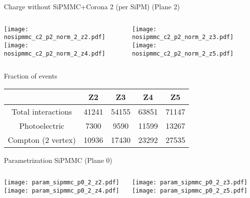\documentclass{beamer}
\begin{document}
\begin{frame}{Charge without SiPMMC+Corona 2 (per SiPM) (Plane 2)}
	\begin{columns}[onlytextwidth]
		\begin{column}{0.5\textwidth}
			\texttt{[image: nosipmmc\_c2\_p2\_norm\_2\_z2.pdf]} \\
			\texttt{[image: nosipmmc\_c2\_p2\_norm\_2\_z4.pdf]}
		 \end{column}
		 \begin{column}{0.5\textwidth}
			\texttt{[image: nosipmmc\_c2\_p2\_norm\_2\_z3.pdf]} \\
			\texttt{[image: nosipmmc\_c2\_p2\_norm\_2\_z5.pdf]}
		 \end{column}
 \end{columns}
\end{frame}

\begin{frame}{Fraction of events}
\begin{center}
 \begin{tabular}{c|cccc|}
  \toprule
    & \textbf{Z2} & \textbf{Z3} & \textbf{Z4} & \textbf{Z5} \\
   \hline
  Total interactions & 41241 & 54155 & 63851  & 71147\\
  Photoelectric & 7300 & 9590 & 11599 & 13267\\
  Compton (2 vertex) & 10936 & 17430 & 23292 & 27535 \\ 
  \toprule
 \end{tabular}
\end{center}
\end{frame}

\begin{frame}{Parametrization SiPMMC (Plane 0)}
	\begin{columns}[onlytextwidth]
		\begin{column}{0.5\textwidth}
			\texttt{[image: param\_sipmmc\_p0\_2\_z2.pdf]} \\
			\texttt{[image: param\_sipmmc\_p0\_2\_z4.pdf]}
		 \end{column}
		 \begin{column}{0.5\textwidth}
			\texttt{[image: param\_sipmmc\_p0\_2\_z3.pdf]} \\
			\texttt{[image: param\_sipmmc\_p0\_2\_z5.pdf]}
		 \end{column}
 \end{columns}
\end{frame}
\end{document}
